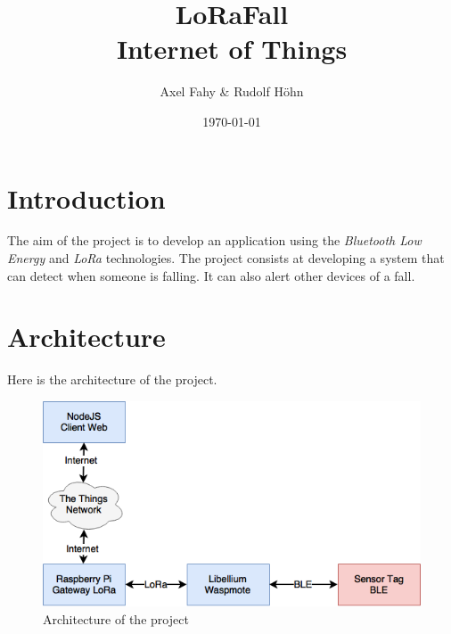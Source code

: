 \documentclass[11pt]{article}
\title{\vspace{-2cm}LoRaFall\\Internet of Things}
\author{Axel Fahy \& Rudolf Höhn}
\date{\today}
\begin{document}
\maketitle

\thispagestyle{empty} %


\sectionfont{\scshape}

\section{Introduction}

The aim of the project is to develop an application using the \textit{Bluetooth Low Energy} and \textit{LoRa} technologies. The project consists at developing a system that can detect when someone is falling. It can also alert other devices of a fall.

\section{Architecture}

Here is the architecture of the project.

\begin{figure}[H]
    \centering
    \includegraphics[scale=0.6]{architecture_iot_lora_project.png}
    \caption{Architecture of the project}
\end{figure}
\end{document}
